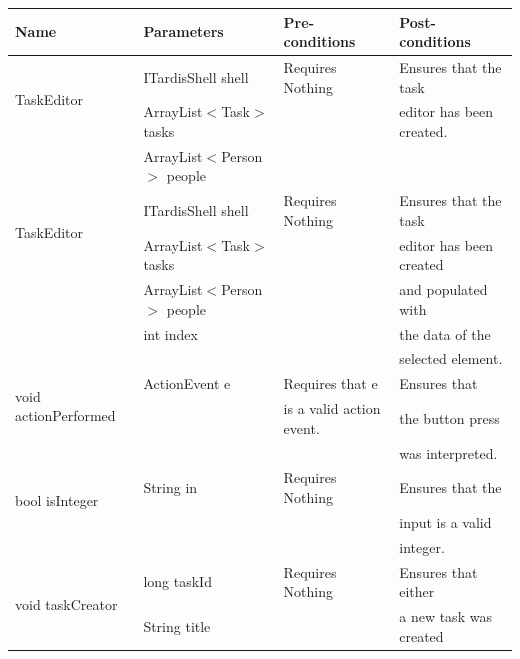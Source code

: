 \begin{tabular}{| l | l | l | l |}
\hline
Name & Parameters & Pre-conditions & Post-conditions\\
\hline
\multirow{2}{*}{TaskEditor} & ITardisShell shell                         & Requires Nothing & Ensures that the task\\ 
			          & ArrayList$<$Task$>$ tasks       &                             & editor has been created.\\ 
                                              & ArrayList$<$Person$>$ people &                             & 
\\
\hline
\multirow{2}{*}{TaskEditor} & ITardisShell shell                         & Requires Nothing & Ensures that the task\\ 
			          & ArrayList$<$Task$>$ tasks       &                             & editor has been created\\ 
                                              & ArrayList$<$Person$>$ people &                             & and populated with\\
			          & int index                                      &                            & the data of the\\
			          &                                                     &                            & selected element.
\\
\hline
\multirow{2}{*}{void actionPerformed} & ActionEvent e & Requires that e            & Ensures that\\
                                                        &                        & is a valid action event. & the button press\\
                                                        &                        &                                      & was interpreted.
\\
\hline
\multirow{2}{*}{bool isInteger} & String in & Requires Nothing & Ensures that the\\
		 	                &               &                             & input is a valid\\
		 	                &               &                             & integer.
\\
\hline
\multirow{2}{*}{void taskCreator} & long taskId                    & Requires Nothing & Ensures that either\\
		 	             & String title                     &                             & a new task was created\\

\end{tabular}
